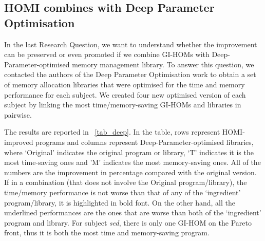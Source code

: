 \documentclass[oribibl]{llncs}
\begin{document}
{\subsection{HOMI combines with Deep Parameter Optimisation}
\label{sec_resdeep}

In the last Research Question, we want to understand whether the improvement can be preserved or even promoted if we combine GI-HOMs with Deep-Parameter-optimised memory management library. 
To answer this question, we contacted the authors of the Deep Parameter Optimisation work to obtain a set of memory allocation libraries that were optimised for the time and memory performance for each subject. We created four new optimised version of each subject by linking the most time/memory-saving GI-HOMs and libraries in pairwise.


The results are reported in \tablename~\ref{tab_deep}.
In the table, rows represent HOMI-improved programs and columns represent Deep-Parameter-optimised libraries, where `Original' indicates the original program or library, `T' indicates it is the most time-saving ones and 'M' indicates the most memory-saving ones.
All of the numbers are the improvement in percentage compared with the original version.
If in a combination (that does not involve the Original program/library), the time/memory performance is not worse than that of any of the `ingredient' program/library, it is highlighted in bold font.
On the other hand, all the underlined performances are the ones that are worse than both of the `ingredient' program and library.
For subject \emph{sed}, there is only one GI-HOM on the Pareto front, thus it is both the most time and memory-saving program.

}
\end{document}
